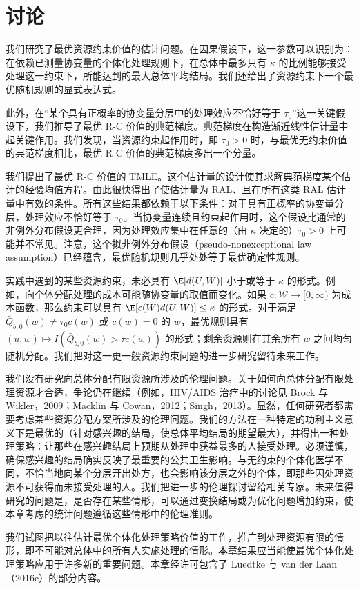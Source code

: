 \section{讨论}

我们研究了最优资源约束价值的估计问题。在因果假设下，这一参数可以识别为：在依赖已测量协变量的个体化处理规则下，在总体中最多只有 $\kappa$ 的比例能够接受处理这一约束下，所能达到的最大总体平均结局。我们还给出了资源约束下一个最优随机规则的显式表达式。

此外，在“某个具有正概率的协变量分层中的处理效应不恰好等于 $\tau_0$”这一关键假设下，我们推导了最优 R-C 价值的典范梯度。典范梯度在构造渐近线性估计量中起关键作用。我们发现，当资源约束起作用时，即 $\tau_0>0$ 时，与最优无约束价值的典范梯度相比，最优 R-C 价值的典范梯度多出一个分量。

\begin{sourcebox}
我们提出了最优 R-C 价值的 TMLE。这个估计量的设计使其求解典范梯度某个估计的经验均值方程。由此很快得出了使估计量为 RAL、且在所有这类 RAL 估计量中有效的条件。所有这些结果都依赖于以下条件：对于具有正概率的协变量分层，处理效应不恰好等于 $\tau_0$。当协变量连续且约束起作用时，这个假设比通常的非例外分布假设更合理，因为处理效应集中在任意的（由 $\kappa$ 决定的）$\tau_0>0$ 上可能并不常见。注意，这个拟非例外分布假设（pseudo-nonexceptional law assumption）已经蕴含，最优随机规则几乎处处等于最优确定性规则。
\end{sourcebox}

实践中遇到的某些资源约束，未必具有 $\E[d(U,W)]$ 小于或等于 $\kappa$ 的形式。例如，向个体分配处理的成本可能随协变量的取值而变化。如果 $c:\mathcal W\to[0,\infty)$ 为成本函数，那么约束可以具有 $\E[c(W)d(U,W)]\leq\kappa$ 的形式。对于满足 $\bar Q_{b,0}(w)\ne\tau_0c(w)$ 或 $c(w)=0$ 的 $w$，最优规则具有 $(u,w)\mapsto I(\bar Q_{b,0}(w)>\tau c(w))$ 的形式；剩余资源则在其余所有 $w$ 之间均匀随机分配。我们把对这一更一般资源约束问题的进一步研究留待未来工作。

我们没有研究向总体分配有限资源所涉及的伦理问题。关于如何向总体分配有限处理资源才合适，争论仍在继续（例如，HIV/AIDS 治疗中的讨论见 Brock 与 Wikler，2009；Macklin 与 Cowan，2012；Singh，2013）。显然，任何研究者都需要考虑某些资源分配方案所涉及的伦理问题。我们的方法在一种特定的功利主义意义下是最优的（针对感兴趣的结局，使总体平均结局的期望最大），并得出一种处理策略：让那些在感兴趣结局上预期从处理中获益最多的人接受处理。必须谨慎，确保感兴趣的结局确实反映了最重要的公共卫生影响。与无约束的个体化医学不同，不恰当地向某个分层开出处方，也会影响该分层之外的个体，即那些因处理资源不可获得而未接受处理的人。我们把进一步的伦理探讨留给相关专家。未来值得研究的问题是，是否存在某些情形，可以通过变换结局或为优化问题增加约束，使本章考虑的统计问题遵循这些情形中的伦理准则。

我们试图把以往估计最优个体化处理策略价值的工作，推广到处理资源有限的情形，即不可能对总体中的所有人实施处理的情形。本章结果应当能使最优个体化处理策略应用于许多新的重要问题。本章经许可包含了 Luedtke 与 van der Laan（2016c）的部分内容。
